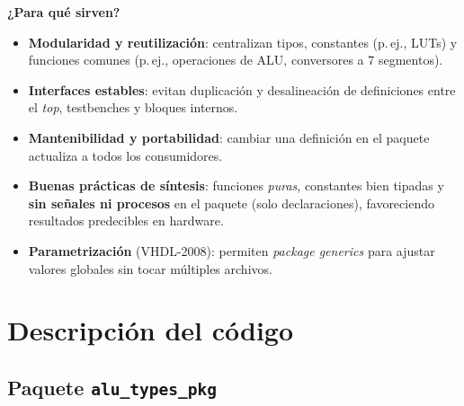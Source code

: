 \documentclass[a4paper,12pt]{article}
\begin{document}
\noindent\textbf{¿Para qué sirven?} 
\begin{itemize}
  \item \textbf{Modularidad y reutilización}: centralizan tipos, constantes (p.\,ej., LUTs) y funciones comunes (p.\,ej., operaciones de ALU, conversores a 7 segmentos).
  \item \textbf{Interfaces estables}: evitan duplicación y desalineación de definiciones entre el \textit{top}, testbenches y bloques internos.
  \item \textbf{Mantenibilidad y portabilidad}: cambiar una definición en el paquete actualiza a todos los consumidores.
  \item \textbf{Buenas prácticas de síntesis}: funciones \emph{puras}, constantes bien tipadas y \textbf{sin señales ni procesos} en el paquete (solo declaraciones), favoreciendo resultados predecibles en hardware.
  \item \textbf{Parametrización} (VHDL-2008): permiten \textit{package generics} para ajustar valores globales sin tocar múltiples archivos.
\end{itemize}


\section{Descripción del código}
\label{sec:descripcion-codigo}

\subsection{Paquete \texttt{alu\_types\_pkg}}
\label{subsec:alu-types-pkg}
\end{document}
